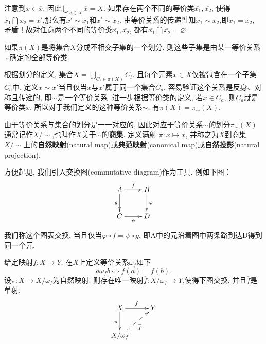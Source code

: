\documentclass[color=green,mathpazo,titlestyle=hang]{elegantbook}
\begin{document}
\begin{newproof}
	注意到$x\in \overline{x}$, 因此$\bigcup_{x\in X}\overline{x}=X$. 如果存在两个不同的等价类$\overline{x_1},\overline{x_2}$, 使得$\overline{x_1}\bigcap\overline{x_2}=x'$,那么有$x'\sim x_1$和$x'\sim x_2$. 由等价关系的传递性知$x_1\sim x_2$,即$\overline{x_1}=\overline{x_2}$, 矛盾！故对任意两个不同的等价类$\overline{x_1},\overline{x_2}$, 都有$\overline{x_1}\bigcap\overline{x_2}=\varnothing.$
	
\end{newproof}


\begin{newprop}
	如果$\pi(X)$是将集合$X$分成不相交子集的一个划分, 则这些子集是由某一等价关系$\sim$确定的全部等价类.
\end{newprop}


\begin{newproof}
	根据划分的定义, 集合$X=\bigcup_{C_t\in\pi(X)}C_t$. 且每个元素$x\in X$仅被包含在一个子集$C_a$中. 定义$x\sim x'$当且仅当$x$与$x'$属于同一个集合$C_a$. 容易验证这个关系是反身、对称且传递的, 即$\sim$是一个等价关系. 进一步根据等价类的定义, 若$x\in C_a$, 则$C_a$就是等价类$\overline{x}$. 所以对于我们定义的这种等价关系$\sim$, 有$\pi(X)=\pi_{\sim}(X)$.
	
\end{newproof}
\par

由于等价关系与集合的划分是一一对应的, 因此对应于等价关系$\sim$的划分$\pi_{\sim}(X)$通常记作$X/\sim$,也叫作$X$关于$\sim$的\textbf{商集}. 定义满射
$\pi:x\longmapsto\overline{x}$, 并称之为$X$到商集$X/\sim$上的\textbf{自然映射}(natural map)或\textbf{典范映射}(canonical map)或\textbf{自然投影}(natural projection).

方便起见, 我们引入交换图(commutative diagram)作为工具. 例如下图：
\[\xymatrix{
	A\ar[r]^{f}\ar[d]_{g} & B\ar[d]^{\varphi} \\
	C\ar[r]_{\psi}        & D 
}\]
我们称这个图表交换, 当且仅当$\varphi\circ f = \psi\circ g$, 即A中的元沿着图中两条路到达D得到同一个元.


\begin{newprop}
	给定映射$f:X\longrightarrow Y$. 在$X$上定义等价关系$\omega_f$如下
	\[a\omega_f b \iff f(a) = f(b).\]
	设$\pi:X\longrightarrow X/\omega_f$为自然映射. 则存在唯一映射$\overline{f}:X/\omega_f\longrightarrow Y$,使得下图交换, 并且$\overline{f}$是单射.
    \[\xymatrix{
    	X\ar[d]_{\pi}\ar[r]^{f} & Y \\
    	X/\omega_f \ar@{-->}[ur]_{\overline{f}} &  
    }\]
\end{newprop}
\end{document}
